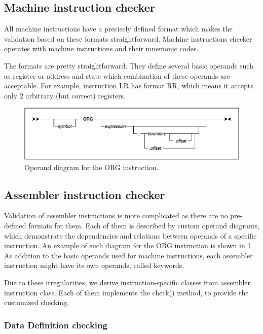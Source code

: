 \subsection{Machine instruction checker}

All machine instructions have a precisely defined format which makes the validation based on these formats straightforward. Machine instructions checker operates with machine instructions and their mnemonic codes.

The formats are pretty straightforward. They define several basic operands such as register or address and state which combination of these operands are acceptable. For example, instruction LR has format RR, which means it accepts only 2 arbitrary (but correct) registers. 

\begin{figure}
	\centering
	\includegraphics[width=\textwidth]{img/org_diagram}
	\caption{Operand diagram for the ORG instruction.}
	
	\label{fig01:check}
\end{figure}

\subsection{Assembler instruction checker}
\label{sub:asm_check}

Validation of assembler instructions is more complicated as there are no pre-defined formats for them. Each of them is described by custom operand diagrams, which demonstrate the dependencies and relations between operands of a specific instruction. An example of such diagram for the ORG instruction is shown in \cref{fig01:check}. As addition to the basic operands used for machine instructions, each assembler instruction might have its own operands, called keywords.

Due to these irregularities, we derive instruction-specific classes from assembler instruction class. Each of them implements the check() method, to provide the customized checking.

\subsubsection{Data Definition checking}

